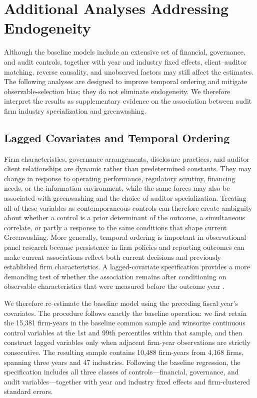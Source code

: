 \documentclass[11pt]{article}
\begin{document}
\clearpage

\clearpage

\clearpage

\clearpage

\section{Additional Analyses Addressing Endogeneity}

Although the baseline models include an extensive set of financial, governance, and audit controls, 
together with year and industry fixed effects, client--auditor matching, reverse causality, and unobserved factors may still affect the estimates.
The following analyses are designed to improve temporal ordering and mitigate observable-selection bias; they do not eliminate endogeneity. 
We therefore interpret the results as supplementary evidence on the association between audit firm industry specialization and greenwashing.

\subsection{Lagged Covariates and Temporal Ordering}

Firm characteristics, governance arrangements, disclosure practices, and auditor--client relationships are dynamic rather than predetermined constants. 
They may change in response to operating performance, regulatory scrutiny, financing needs, or the information environment, while the same forces may also be associated with greenwashing and the choice of auditor specialization. 
Treating all of these variables as contemporaneous controls can therefore create ambiguity about whether a control is a prior determinant of the outcome, a simultaneous correlate, or partly a response to the same conditions that shape current Greenwashing. 
More generally, temporal ordering is important in observational panel research because persistence in firm policies and reporting outcomes can make current associations reflect both current decisions and previously established firm characteristics. 
A lagged-covariate specification provides a more demanding test of whether the association remains after conditioning on observable characteristics that were measured before the outcome year \citep{bates2012crashrisk}.

We therefore re-estimate the baseline model using the preceding fiscal year's covariates. 
The procedure follows exactly the baseline operation: we first retain the 15,381 firm-years in the baseline common sample and winsorize continuous control variables at the 1st and 99th percentiles within that sample, and then construct lagged variables only when adjacent firm-year observations are strictly consecutive. 
The resulting sample contains 10,488 firm-years from 4,168 firms, spanning three years and 47 industries. 
Following the baseline regression, the specification includes all three classes of controls---financial, governance, and audit variables---together with year and industry fixed effects and firm-clustered standard errors.
\end{document}
